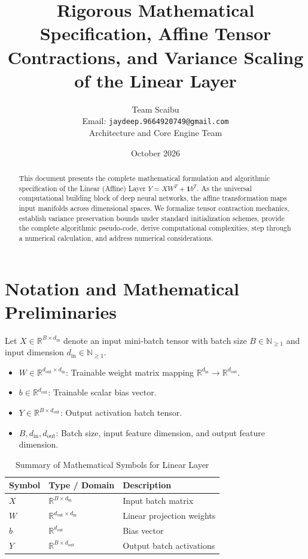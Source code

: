 \documentclass[11pt,a4paper]{article}
\title{\textbf{Rigorous Mathematical Specification, Affine Tensor Contractions, and Variance Scaling of the Linear Layer}}
\author{Team Scaibu \\ \small Email: \texttt{jaydeep.9664920749@gmail.com} \\ \small Architecture and Core Engine Team}
\date{October 2026}
\theoremstyle{definition}
\begin{document}
\maketitle

\begin{abstract}
This document presents the complete mathematical formulation and algorithmic specification of the Linear (Affine) Layer $Y = X W^T + \mathbf{1} b^T$. As the universal computational building block of deep neural networks, the affine transformation maps input manifolds across dimensional spaces. We formalize tensor contraction mechanics, establish variance preservation bounds under standard initialization schemes, provide the complete algorithmic pseudo-code, derive computational complexities, step through a numerical calculation, and address numerical considerations.
\end{abstract}

\section{Notation and Mathematical Preliminaries}

Let $X \in \mathbb{R}^{B \times d_{\text{in}}}$ denote an input mini-batch tensor with batch size $B \in \mathbb{N}_{\ge 1}$ and input dimension $d_{\text{in}} \in \mathbb{N}_{\ge 1}$.

\begin{itemize}
    \item $W \in \mathbb{R}^{d_{\text{out}} \times d_{\text{in}}}$: Trainable weight matrix mapping $\mathbb{R}^{d_{\text{in}}} \to \mathbb{R}^{d_{\text{out}}}$.
    \item $b \in \mathbb{R}^{d_{\text{out}}}$: Trainable scalar bias vector.
    \item $Y \in \mathbb{R}^{B \times d_{\text{out}}}$: Output activation batch tensor.
    \item $B, d_{\text{in}}, d_{\text{out}}$: Batch size, input feature dimension, and output feature dimension.
\end{itemize}

\begin{table}[h]
\centering
\caption{Summary of Mathematical Symbols for Linear Layer}
\begin{tabular}{lll}
\toprule
\textbf{Symbol} & \textbf{Type / Domain} & \textbf{Description} \\
\midrule
$X$ & $\mathbb{R}^{B \times d_{\text{in}}}$ & Input batch matrix \\
$W$ & $\mathbb{R}^{d_{\text{out}} \times d_{\text{in}}}$ & Linear projection weights \\
$b$ & $\mathbb{R}^{d_{\text{out}}}$ & Bias vector \\
$Y$ & $\mathbb{R}^{B \times d_{\text{out}}}$ & Output batch activations \\
\bottomrule
\end{tabular}
\end{table}
\end{document}
